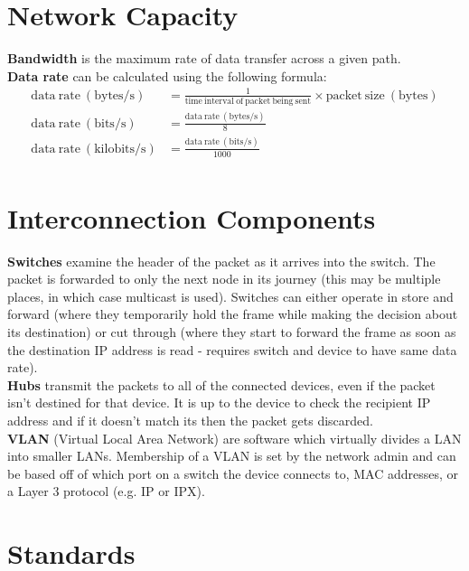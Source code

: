 \documentclass[a4paper,11pt]{article}
\begin{document}
\section{Network Capacity}
\textbf{Bandwidth} is the maximum rate of data transfer across a given path.\\
\textbf{Data rate} can be calculated using the following formula:
\begin{align*}
\mathrm{data\ rate\ (bytes/s)} &= \frac{1}{\mathrm{time\ interval\ of\ packet\ being\ sent}} \times \mathrm{packet\ size\ (bytes)}\\
\mathrm{data\ rate\ (bits/s)} &= \frac{\mathrm{data\ rate\ (bytes/s)}}{8}\\
\mathrm{data\ rate\ (kilobits/s)} &= \frac{\mathrm{data\ rate\ (bits/s)}}{1000}\\
\end{align*}

\section{Interconnection Components}
\textbf{Switches} examine the header of the packet as it arrives into the switch. The packet is forwarded to only the next node in its journey (this may be multiple places, in which case multicast is used). Switches can either operate in store and forward (where they temporarily hold the frame while making the decision about its destination) or cut through (where they start to forward the frame as soon as the destination IP address is read - requires switch and device to have same data rate).\\
\textbf{Hubs} transmit the packets to all of the connected devices, even if the packet isn't destined for that device. It is up to the device to check the recipient IP address and if it doesn't match its then the packet gets discarded.\\
\textbf{VLAN} (Virtual Local Area Network) are software which virtually divides a LAN into smaller LANs. Membership of a VLAN is set by the network admin and can be based off of which port on a switch the device connects to, MAC addresses, or a Layer 3 protocol (e.g. IP or IPX). 

\section{Standards}
\end{document}
